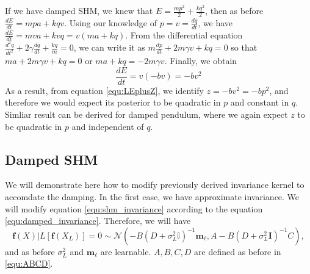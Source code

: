\documentclass{statsmsc}
\begin{document}
If we have damped SHM, we knew that $E=\frac{mp^2}{2}+\frac{kq^2}{2}$, then as before $\frac{dE}{dt}=mpa+kqv$.
Using our knowledge of $p=v=\frac{dq}{dt}$, we have $\frac{dE}{dt}=mva+kvq=v(ma+kq)$.
From the differential equation $\frac{d^2q}{dt^2}+2\gamma \frac{dq}{dt} +\frac{kq}{m}=0$, we can write it as $m\frac{dp}{dt}+2m\gamma v + kq=0$ so that $ma+2m\gamma v+kq=0$ or $ma+kq=-2m\gamma v$.
Finally, we obtain
$$
\frac{dE}{dt} = v(-bv) = -bv^2
$$
As a result, from equation \ref{equ:LEplusZ}, we identify $z=-bv^2=-bp^2$, and therefore we would expect its posterior to be quadratic in $p$ and constant in $q$.
Simliar result can be derived for damped pendulum, where we again expect $z$ to be quadratic in $p$ and independent of $q$.

\subsection{Damped SHM}
We will demonstrate here how to modify previously derived invariance kernel to accomdate the damping.
In the first case, we have approximate invariance.
We will modify equation \ref{equ:shm_invariance} according to the equation \ref{equ:damped_invariance}.
Therefore, we will have
$$
\mathbf{f}(X)|L[\mathbf{f}(X_L)]=0\sim\mathcal{N}(-B(D+\sigma^2_L\mathbb{I})^{-1}\mathbf{m}_\ell,A-B(D+\sigma^2_L\mathbf{I})^{-1}C),
$$
and as before $\sigma_L^2$ and $\mathbf{m}_\ell$ are learnable.
$A, B, C, D$ are defined as before in \ref{equ:ABCD}.
\end{document}
